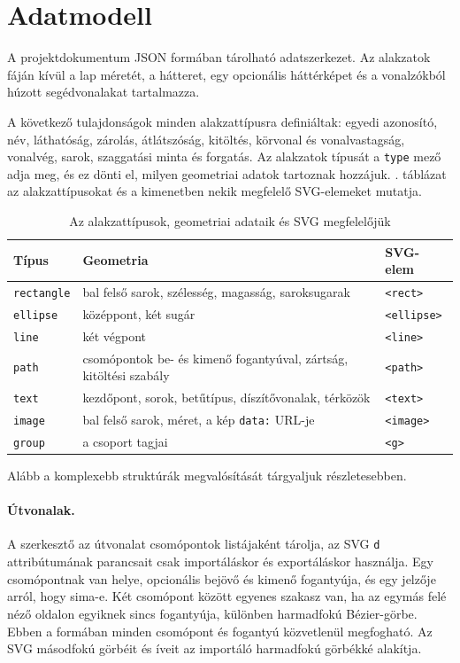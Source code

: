 \section{Adatmodell}
\label{sec:data_model}

A projektdokumentum JSON formában tárolható adatszerkezet. Az alakzatok fáján kívül a lap méretét, a hátteret, egy opcionális háttérképet és a vonalzókból húzott segédvonalakat tartalmazza.

A következő tulajdonságok minden alakzattípusra definiáltak: egyedi azonosító, név, láthatóság, zárolás, átlátszóság, kitöltés, körvonal és vonalvastagság, vonalvég, sarok, szaggatási minta és forgatás. Az alakzatok típusát a \texttt{type} mező adja meg, és ez dönti el, milyen geometriai adatok tartoznak hozzájuk. . táblázat az alakzattípusokat és a kimenetben nekik megfelelő SVG-elemeket mutatja.

\begin{table}[!htbp]
\caption{Az alakzattípusok, geometriai adataik és SVG megfelelőjük}
\label{tab:shape-types}
\centering
\footnotesize
\begin{tabular}{|l|>{\raggedright\arraybackslash}p{}|l|}
\hline
\textbf{Típus} & \textbf{Geometria} & \textbf{SVG-elem} \\ \hline
\texttt{rectangle} & bal felső sarok, szélesség, magasság, saroksugarak & \texttt{<rect>} \\ \hline
\texttt{ellipse} & középpont, két sugár & \texttt{<ellipse>} \\ \hline
\texttt{line} & két végpont & \texttt{<line>} \\ \hline
\texttt{path} & csomópontok be- és kimenő fogantyúval, zártság, kitöltési szabály & \texttt{<path>} \\ \hline
\texttt{text} & kezdőpont, sorok, betűtípus, díszítővonalak, térközök & \texttt{<text>} \\ \hline
\texttt{image} & bal felső sarok, méret, a kép \texttt{data:} URL-je & \texttt{<image>} \\ \hline
\texttt{group} & a csoport tagjai & \texttt{<g>} \\ \hline
\end{tabular}
\end{table}

Alább a komplexebb struktúrák megvalósítását tárgyaljuk részletesebben.

\paragraph{Útvonalak.} A szerkesztő az útvonalat csomópontok listájaként tárolja, az SVG \texttt{d} attribútumának parancsait csak importáláskor és exportáláskor használja. Egy csomópontnak van helye, opcionális bejövő és kimenő fogantyúja, és egy jelzője arról, hogy sima-e. Két csomópont között egyenes szakasz van, ha az egymás felé néző oldalon egyiknek sincs fogantyúja, különben harmadfokú Bézier-görbe. Ebben a formában minden csomópont és fogantyú közvetlenül megfogható. Az SVG másodfokú görbéit és íveit az importáló harmadfokú görbékké alakítja.

